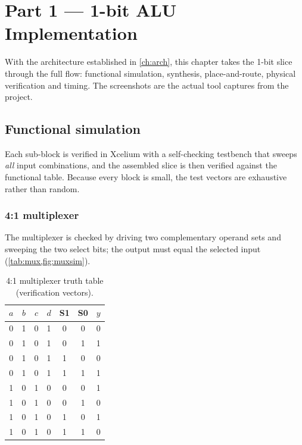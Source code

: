 \chapter{Part 1 --- 1-bit ALU Implementation}
\label{ch:part1}

With the architecture established in \cref{ch:arch}, this chapter takes the
1-bit slice through the full flow: functional simulation, synthesis,
place-and-route, physical verification and timing. The screenshots are the
actual tool captures from the project.

\section{Functional simulation}
Each sub-block is verified in Xcelium with a self-checking testbench that
sweeps \emph{all} input combinations, and the assembled slice is then
verified against the functional table. Because every block is small, the
test vectors are exhaustive rather than random.

\subsection{4:1 multiplexer}
The multiplexer is checked by driving two complementary operand sets and
sweeping the two select bits; the output must equal the selected input
(\cref{tab:mux,fig:muxsim}).

\begin{table}[htbp]
\centering
\caption{4:1 multiplexer truth table (verification vectors).}
\label{tab:mux}
\small
\begin{tabular}{@{}cccc cc c@{}}
\toprule
$a$ & $b$ & $c$ & $d$ & S1 & S0 & $y$\\
\midrule
0&1&0&1 & 0&0 & 0\\
0&1&0&1 & 0&1 & 1\\
0&1&0&1 & 1&0 & 0\\
0&1&0&1 & 1&1 & 1\\
1&0&1&0 & 0&0 & 1\\
1&0&1&0 & 0&1 & 0\\
1&0&1&0 & 1&0 & 1\\
1&0&1&0 & 1&1 & 0\\
\bottomrule
\end{tabular}
\end{table}



